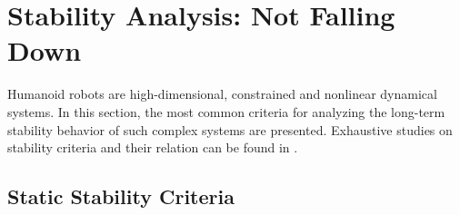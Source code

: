 

\section{Stability Analysis: Not Falling Down}
Humanoid robots are high-dimensional, constrained and nonlinear dynamical systems. In this section, the most common criteria  for analyzing the long-term stability behavior of such complex systems are presented. Exhaustive studies on stability criteria and their relation can be found in \cite{garcia2002classification, dekker2009zero, siciliano2016springer}.

\subsection{Static Stability Criteria}
